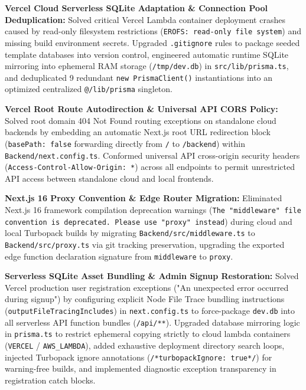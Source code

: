 \documentclass[12pt,a4paper]{article}
\begin{document}
\begin{description}[style=multiline, leftmargin=2.5cm, font=\bfseries\color{primaryBlue}]
    \item[Phase 73] \textbf{Vercel Cloud Serverless SQLite Adaptation \& Connection Pool Deduplication:} Solved critical Vercel Lambda container deployment crashes caused by read-only filesystem restrictions (\texttt{EROFS: read-only file system}) and missing build environment secrets. Upgraded \texttt{.gitignore} rules to package seeded template databases into version control, engineered automatic runtime SQLite mirroring into ephemeral RAM storage (\texttt{/tmp/dev.db}) in \texttt{src/lib/prisma.ts}, and deduplicated 9 redundant \texttt{new PrismaClient()} instantiations into an optimized centralized \texttt{@/lib/prisma} singleton.
    \item[Phase 74] \textbf{Vercel Root Route Autodirection \& Universal API CORS Policy:} Solved root domain 404 Not Found routing exceptions on standalone cloud backends by embedding an automatic Next.js root URL redirection block (\texttt{basePath: false} forwarding directly from \texttt{/} to \texttt{/backend}) within \texttt{Backend/next.config.ts}. Conformed universal API cross-origin security headers (\texttt{Access-Control-Allow-Origin: *}) across all endpoints to permit unrestricted API access between standalone cloud and local frontends.
    \item[Phase 75] \textbf{Next.js 16 Proxy Convention \& Edge Router Migration:} Eliminated Next.js 16 framework compilation deprecation warnings (\texttt{The "middleware" file convention is deprecated. Please use "proxy" instead}) during cloud and local Turbopack builds by migrating \texttt{Backend/src/middleware.ts} to \texttt{Backend/src/proxy.ts} via git tracking preservation, upgrading the exported edge function declaration signature from \texttt{middleware} to \texttt{proxy}.
    \item[Phase 76] \textbf{Serverless SQLite Asset Bundling \& Admin Signup Restoration:} Solved Vercel production user registration exceptions ("An unexpected error occurred during signup") by configuring explicit Node File Trace bundling instructions (\texttt{outputFileTracingIncludes}) in \texttt{next.config.ts} to force-package \texttt{dev.db} into all serverless API function bundles (\texttt{/api/**}). Upgraded database mirroring logic in \texttt{prisma.ts} to restrict ephemeral copying strictly to cloud lambda containers (\texttt{VERCEL} / \texttt{AWS\_LAMBDA}), added exhaustive deployment directory search loops, injected Turbopack ignore annotations (\texttt{/*turbopackIgnore: true*/}) for warning-free builds, and implemented diagnostic exception transparency in registration catch blocks.

\end{description}
\end{document}
